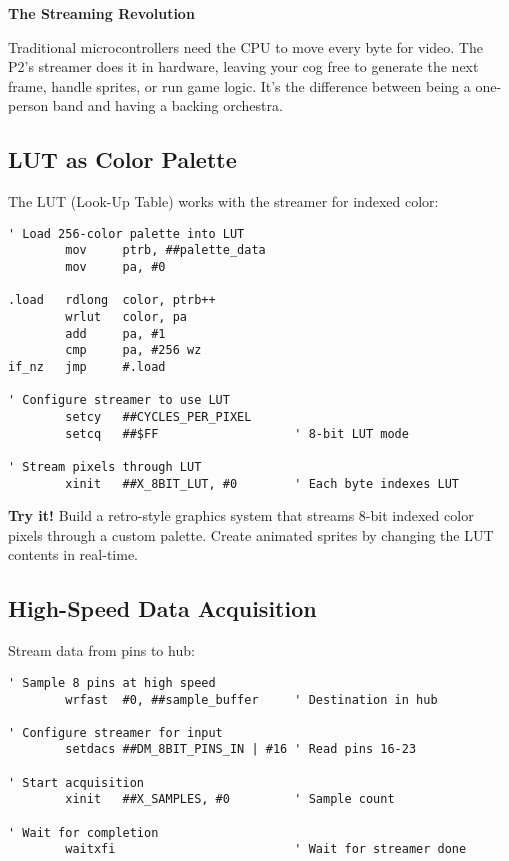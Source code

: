 \documentclass[11pt]{book}
\begin{document}
\begin{interlude}
\textbf{The Streaming Revolution}

Traditional microcontrollers need the CPU to move every byte for video. The P2's streamer does it in hardware, leaving your cog free to generate the next frame, handle sprites, or run game logic. It's the difference between being a one-person band and having a backing orchestra.
\end{interlude}

\hypertarget{lut-as-color-palette}{%
\subsection{LUT as Color Palette}\label{lut-as-color-palette}}

The LUT (Look-Up Table) works with the streamer for indexed color:

\begin{lstlisting}
' Load 256-color palette into LUT
        mov     ptrb, ##palette_data
        mov     pa, #0
        
.load   rdlong  color, ptrb++
        wrlut   color, pa
        add     pa, #1
        cmp     pa, #256 wz
if_nz   jmp     #.load

' Configure streamer to use LUT
        setcy   ##CYCLES_PER_PIXEL
        setcq   ##$FF                   ' 8-bit LUT mode
        
' Stream pixels through LUT
        xinit   ##X_8BIT_LUT, #0        ' Each byte indexes LUT
\end{lstlisting}

\textbf{Try it!} Build a retro-style graphics system that streams 8-bit
indexed color pixels through a custom palette. Create animated sprites
by changing the LUT contents in real-time.

\hypertarget{high-speed-data-acquisition}{%
\subsection{High-Speed Data
Acquisition}\label{high-speed-data-acquisition}}

Stream data from pins to hub:

\begin{lstlisting}
' Sample 8 pins at high speed
        wrfast  #0, ##sample_buffer     ' Destination in hub
        
' Configure streamer for input
        setdacs ##DM_8BIT_PINS_IN | #16 ' Read pins 16-23
        
' Start acquisition
        xinit   ##X_SAMPLES, #0         ' Sample count
        
' Wait for completion
        waitxfi                         ' Wait for streamer done
\end{lstlisting}
\end{document}
